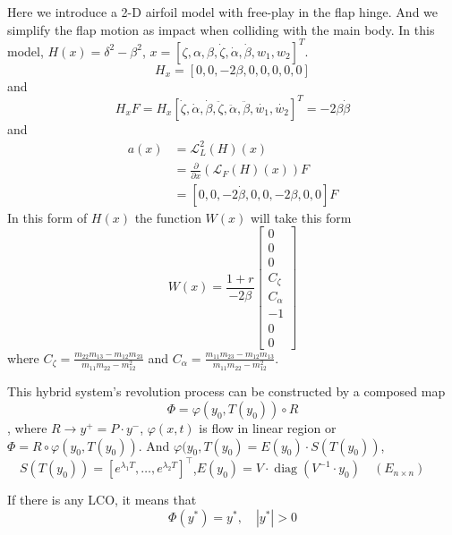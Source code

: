 \documentclass{article}
\begin{document}
Here we introduce a 2-D airfoil model with free-play in the flap hinge. And we simplify the flap motion as impact when colliding with the main body. In this model, $H(x)=\delta^2-\beta^2$,  $x=[\zeta,\alpha,\beta,\dot{\zeta},\dot{\alpha},\dot{\beta},w_1,w_2]^T$. 
\[H_x=[0,0,-2\beta,0,0,0,0,0]\] and \[H_xF=H_x[
\dot{\zeta},\dot{\alpha},\dot{\beta},\ddot{\zeta},\ddot{\alpha},\ddot{\beta},\dot{w_1},\dot{w_2}]^T=-2\beta \dot{\beta}\]
and \begin{align}
    a(x)&=\mathcal{L}_{L}^2(H)(x)\\&=\frac{\partial}{\partial x}(\mathcal{L}_F(H)(x))F\\&=[0,0,-2\dot{\beta},0,0,-2\beta,0,0]F
\end{align}
% 
In this form of $H(x)$ the function $W(x)$ will take this form
\begin{equation}
    W(x)=\frac{1+r}{-2\beta}\begin{bmatrix}
    0\\0\\0\\C_{\zeta}\\C_{\alpha}\\-1\\0\\0
    \end{bmatrix}
\end{equation}
where $\displaystyle C_{\zeta}=\frac{m_{22} m_{13}-m_{12} m_{23}}{m_{11}m_{22}-m_{12}^2}$ and $\displaystyle C_{\alpha}=\frac{m_{11} m_{23}-m_{12} m_{13}}{m_{11}m_{22}-m_{12}^2}$. 


This hybrid system's revolution process can be constructed by a composed map 
\[
\Phi=\varphi\left(y_{0}, T(y_0)\right) \circ R \] ,  where $R \rightarrow y^{+}=P \cdot y^{-}$, $\varphi(x, t) $  is flow in linear region or $ \Phi=R \circ \varphi\left(y_{0}, T\left(y_{0}\right)\right)$. And
$\varphi (y_{0}, T(y_{0})=E(y_{0}) \cdot S(T(y_{0}))$, $\quad S(T (y_{0}))=\left[e^{\lambda_{1} T}, \ldots, e^{\lambda_{2} T}\right]^{\top}$,$E(y_{0})=V \cdot \operatorname{diag}(V^{-1} \cdot y_{0}) \quad(E_{n \times n})$

If there is any LCO, it means that
\[\Phi\left(y^{*}\right)=y^{*}, \quad\left|y^{*}\right|>0\]
\end{document}
